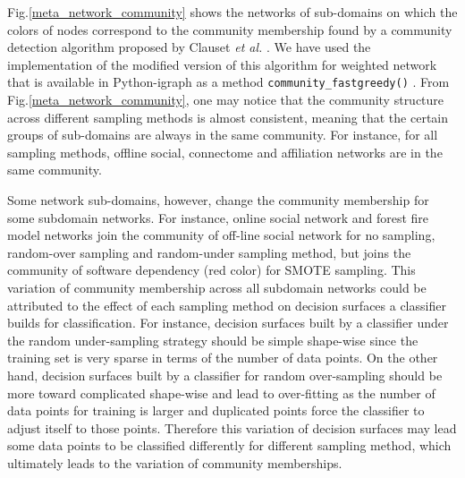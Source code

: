 \documentclass{article}
\begin{document}
Fig.\ref{meta_network_community} shows the networks of sub-domains on which the colors of nodes correspond to the community membership found by a community detection algorithm proposed by Clauset \textit{et al.} \cite{CNMAlgorithm}. We have used the implementation of the modified version of this algorithm for weighted network that is available in Python-igraph as a method \texttt{community\_fastgreedy()} \cite{igraph}. From Fig.\ref{meta_network_community}, one may notice that the community structure across different sampling methods is almost consistent, meaning that the certain groups of sub-domains are always in the same community.  For instance, for all sampling methods, offline social, connectome and affiliation networks are in the same community. 

Some network sub-domains, however, change the community membership for some subdomain networks. For instance, online social network and forest fire model networks join the community of off-line social network for no sampling, random-over sampling and random-under sampling method, but joins the community of software dependency (red color) for SMOTE sampling. This variation of community membership across all subdomain networks could be attributed to the effect of each sampling method on decision surfaces a classifier builds for classification. For instance, decision surfaces built by a classifier under the random under-sampling strategy should be simple shape-wise since the training set is very sparse in terms of the number of data points. On the other hand, decision surfaces built by a classifier for random over-sampling should be more toward complicated shape-wise and lead to over-fitting as the number of data points for training is larger and duplicated points force the classifier to adjust itself to those points. Therefore this variation of decision surfaces may lead some data points to be classified differently for different sampling method, which ultimately leads to the variation of community memberships.
\end{document}
